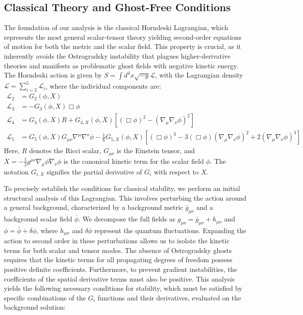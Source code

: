 \documentclass[twocolumn]{aastex631}
\begin{document}
\subsection{Classical Theory and Ghost-Free Conditions}

The foundation of our analysis is the classical Horndeski Lagrangian, which represents the most general scalar-tensor theory yielding second-order equations of motion for both the metric and the scalar field. This property is crucial, as it inherently avoids the Ostrogradsky instability that plagues higher-derivative theories and manifests as problematic ghost fields with negative kinetic energy. The Horndeski action is given by $S = \int d^4x \sqrt{-g} \mathcal{L}$, with the Lagrangian density $\mathcal{L} = \sum_{i=2}^{5} \mathcal{L}_i$, where the individual components are:
\begin{align*}
\mathcal{L}_2 &= G_2(\phi, X) \\
\mathcal{L}_3 &= -G_3(\phi, X) \Box\phi \\
\mathcal{L}_4 &= G_4(\phi, X) R + G_{4,X}(\phi, X) [(\Box\phi)^2 - (\nabla_\mu\nabla_\nu\phi)^2] \\
\mathcal{L}_5 &= G_5(\phi, X) G_{\mu\nu}\nabla^\mu\nabla^\nu\phi - \frac{1}{6}G_{5,X}(\phi, X) [(\Box\phi)^3 - 3(\Box\phi)(\nabla_\mu\nabla_\nu\phi)^2 + 2(\nabla_\mu\nabla_\nu\phi)^3]
\end{align*}
Here, $R$ denotes the Ricci scalar, $G_{\mu\nu}$ is the Einstein tensor, and $X = -\frac{1}{2}g^{\mu\nu}\nabla_\mu\phi\nabla_\nu\phi$ is the canonical kinetic term for the scalar field $\phi$. The notation $G_{i,X}$ signifies the partial derivative of $G_i$ with respect to $X$.

To precisely establish the conditions for classical stability, we perform an initial structural analysis of this Lagrangian. This involves perturbing the action around a general background, characterized by a background metric $\bar{g}_{\mu\nu}$ and a background scalar field $\bar{\phi}$. We decompose the full fields as $g_{\mu\nu} = \bar{g}_{\mu\nu} + h_{\mu\nu}$ and $\phi = \bar{\phi} + \delta\phi$, where $h_{\mu\nu}$ and $\delta\phi$ represent the quantum fluctuations. Expanding the action to second order in these perturbations allows us to isolate the kinetic terms for both scalar and tensor modes. The absence of Ostrogradsky ghosts requires that the kinetic terms for all propagating degrees of freedom possess positive definite coefficients. Furthermore, to prevent gradient instabilities, the coefficients of the spatial derivative terms must also be positive. This analysis yields the following necessary conditions for stability, which must be satisfied by specific combinations of the $G_i$ functions and their derivatives, evaluated on the background solution:
\end{document}

